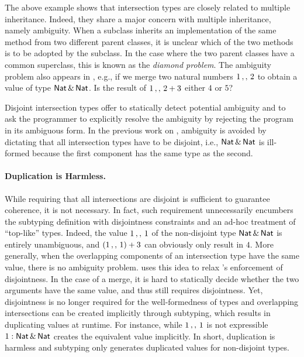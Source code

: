 The above example shows that intersection types are closely related to multiple
inheritance. Indeed, they share a major concern with multiple inheritance,
namely ambiguity. When a subclass inherits an implementation of the same
method from two different parent classes, it is unclear which of the two
methods is to be adopted by the subclass. In the case where the two parent classes
have a common superclass, this is known as the \emph{diamond problem}.
The ambiguity problem also appears in \name,
e.g., if we merge two natural numbers $1 \, ,, \, 2$ to obtain a value of type
$\mathsf{Nat} \,\&\, \mathsf{Nat}$. Is the result of $1 \, ,, \, 2 + 3$ either $4$ or $5$?

Disjoint intersection types offer to statically detect potential ambiguity and
to ask the programmer to explicitly resolve the ambiguity by rejecting the
program in its ambiguous form. In the previous work on \oname, ambiguity is
avoided by dictating that all intersection types have to be disjoint, i.e.,
$\mathsf{Nat} \,\&\, \mathsf{Nat}$ is ill-formed because the first component
has the same type as the second.

\paragraph{Duplication is Harmless.}
While requiring that all intersections are disjoint is sufficient to guarantee
coherence, it is not necessary. In fact,
such requirement unnecessarily encumbers the subtyping definition with disjointness constraints
and an ad-hoc treatment of ``top-like'' types. Indeed, the value $1 \, ,, \, 1$
of the non-disjoint type $\mathsf{Nat} \,\&\, \mathsf{Nat}$ is entirely unambiguous, and
$(1 \, ,, \, 1) + 3$ can obviously only result in $4$. More generally, when the
overlapping components of an intersection type have the same value, there is no
ambiguity problem. \name uses this idea to relax \oname's enforcement of
disjointness. In the case of a merge, it is hard to statically decide whether
the two arguments have the same value, and thus \name still requires
disjointness. Yet, disjointness is no longer required for the well-formedness
of types and overlapping intersections can be created implicitly through
subtyping, which results in duplicating values at runtime. For instance, while
$1 \, ,, \, 1$ is not expressible
$ 1 : \mathsf{Nat} \,\&\, \mathsf{Nat}$ creates the equivalent value implicitly.
In short, duplication is harmless and subtyping only generates duplicated
values for non-disjoint types.

